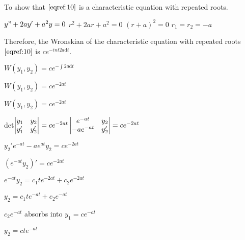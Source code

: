 \documentclass{article}
\begin{document}
To show that $\eqref{eqref:10}$ is a characteristic equation with repeated roots.
\begin{center}
$y" + 2ay' + a^2y = 0$
$r^2 + 2ar + a^2 = 0$
$(r + a)^2 = 0$
$r_1 = r_2 = -a$
\end{center}
Therefore, the Wronskian of the characteristic equation with repeated roots $\eqref{eqref:10}$ is $ce^{-int 2a \mathrm{d}t}$.

\begin{center}
$W(y_1,y_2) = ce^{-\int 2a \mathrm{d}t}$

$W(y_1,y_2) = ce^{-2at}$

$W(y_1,y_2) = ce^{-2at}$


det$\begin{vmatrix}
y_1 & y_2\\
y_1' & y_2'
\end{vmatrix}= ce^{-2at}
\newline
\begin{vmatrix}
e^{-at} & y_2\\
-ae^{-at} & y_2'
\end{vmatrix}
= ce^{-2at}
$
\newline

$y_2'e^{-at} - ae^{at}y_2 = ce^{-2at}$

$(e^{-at}y_2)' = ce^{-2at}$

$e^{-at}y_2 = c_1te^{-2at} + c_2e^{-2at}$

$y_2 = c_1te^{-at} + c_2e^{-at} $

$c_2e^{-at}$ absorbs into $y_1 = ce^{-at}$

$y_2 = cte^{-at}$
\end{center}
\end{document}
